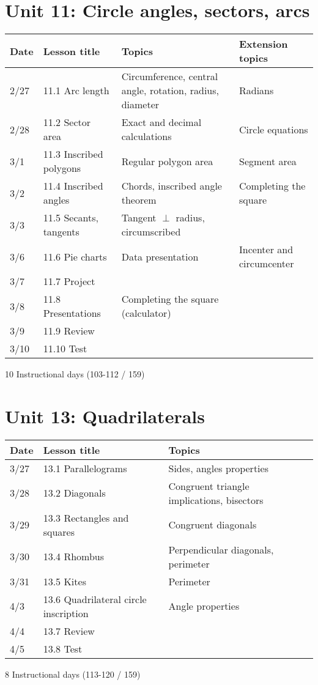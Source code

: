 \documentclass[12pt, twoside]{article}
\begin{document}
\section*{Unit 11: Circle angles, sectors, arcs}
\begin{tabular}{|p{0.9cm}|p{4cm}|p{7cm}|p{5cm}|}
  \hline
  Date & Lesson title & Topics  & Extension topics \\
  \hline
  2/27 & 11.1 Arc length & Circumference, central angle, rotation, radius, diameter & Radians \\
  \hline
  2/28 & 11.2 Sector area & Exact and decimal calculations & Circle equations \\
  \hline
  3/1 & 11.3 Inscribed polygons & Regular polygon area & Segment area \\
  \hline
  3/2 & 11.4 Inscribed angles & Chords, inscribed angle theorem & Completing the square \\
  \hline
  3/3 & 11.5 Secants, tangents & Tangent $\perp$ radius, circumscribed &  \\
  \hline
  3/6 & 11.6 Pie charts & Data presentation & Incenter and circumcenter \\
  \hline
  3/7 & 11.7 Project &  & \\
  \hline
  3/8 & 11.8 Presentations & Completing the square (calculator) &  \\
  \hline
  3/9 & 11.9 Review &  &  \\
  \hline
  3/10 & 11.10 Test &  &  \\
  \hline

\end{tabular} \par \vspace*{0.3cm}
10 Instructional days (103-112 / 159)


\section*{Unit 13: Quadrilaterals}
\begin{tabular}{|p{0.9cm}|p{4cm}|p{7cm}|p{5cm}|}
  \hline
  Date & Lesson title & Topics  &  \\
  \hline
  3/27 & 13.1 Parallelograms & Sides, angles properties &  \\
  \hline
  3/28 & 13.2 Diagonals & Congruent triangle implications, bisectors &  \\
  \hline
  3/29 & 13.3 Rectangles and squares & Congruent diagonals &  \\
  \hline
  3/30 & 13.4 Rhombus & Perpendicular diagonals, perimeter &  \\
  \hline
  3/31 & 13.5 Kites & Perimeter &  \\
  \hline
  4/3 & 13.6 Quadrilateral circle inscription & Angle properties & \\
  \hline
  4/4 & 13.7 Review &  &  \\
  \hline
  4/5 & 13.8 Test &  &  \\
  \hline

\end{tabular} \par \vspace*{0.3cm}
8 Instructional days (113-120 / 159)
\end{document}
